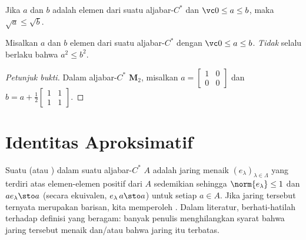 \begin{prop} Jika $a$ dan $b$ adalah elemen dari suatu aljabar-$C^*$ dan $\vc 0 \le a \le b$,
maka $\sqrt a \le \sqrt b$.
\end{prop}

\begin{exam} Misalkan $a$ dan $b$ elemen dari suatu aljabar-$C^*$ dengan $\vc 0 \le a \le b$.
\emph{Tidak} selalu berlaku bahwa $a^2 \le b^2$.
\end{exam}

\begin{proof}[\emph{Petunjuk bukti}] Dalam aljabar-$C^*$ $\mathbf M_2$, misalkan $a =
\begin{bmatrix} 1 & 0 \\ 0 & 0 \end{bmatrix}$ dan
$b = a + \tfrac12 \begin{bmatrix} 1 & 1 \\ 1 & 1 \end{bmatrix}$. \ns
\end{proof}
























\section{Identitas Aproksimatif}
\begin{defn} Suatu
 (atau
) dalam suatu aljabar-$C^*$ $A$ adalah jaring menaik
${(e_\lambda)}_{\lambda \in \Lambda}$ yang terdiri atas elemen-elemen positif dari $A$ sedemikian sehingga
$\norm{e_\lambda} \le 1$ dan $ae_\lambda \sto a$ (secara ekuivalen, $e_\lambda\, a \sto a$)
untuk setiap $a \in A$. Jika jaring tersebut ternyata merupakan barisan, kita memperoleh
. Dalam literatur, berhati-hatilah terhadap definisi yang
beragam: banyak penulis menghilangkan syarat bahwa jaring tersebut menaik dan/atau bahwa jaring itu
terbatas.
\end{defn}


